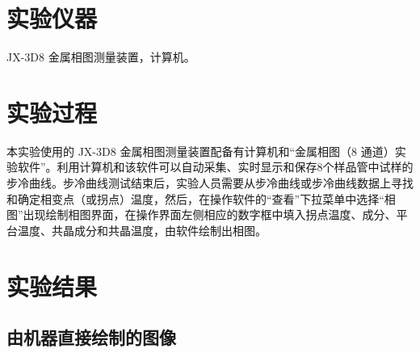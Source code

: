 \documentclass[a4paper,utf8]{article}
\begin{document}
\section{实验仪器}%
    JX-3D8 金属相图测量装置，计算机。
\section{实验过程}%
    本实验使用的 JX-3D8 金属相图测量装置配备有计算机和“金属相图（8 通道）实验软件”。利用计算机和该软件可以自动采集、实时显示和保存8个样品管中试样的步冷曲线。步冷曲线测试结束后，实验人员需要从步冷曲线或步冷曲线数据上寻找和确定相变点（或拐点）温度，然后，在操作软件的“查看”下拉菜单中选择“相图”出现绘制相图界面，在操作界面左侧相应的数字框中填入拐点温度、成分、平台温度、共晶成分和共晶温度，由软件绘制出相图。
\section{实验结果}
    \subsection{由机器直接绘制的图像}
        \begin{figure}[!ht]
            \par
        \end{figure}
\end{document}
